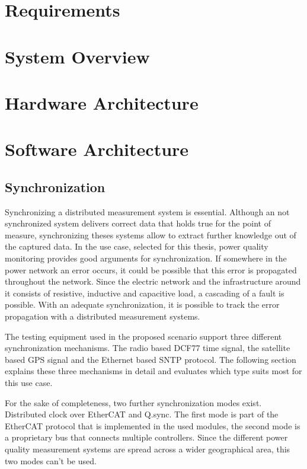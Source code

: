 \section{Requirements}

\section{System Overview}

\section{Hardware Architecture}

\section{Software Architecture}

\subsection{Synchronization}
Synchronizing a distributed measurement system is essential. Although an not synchronized system delivers correct data that holds true for the point of measure, synchronizing theses systems allow to extract further knowledge out of the captured data. In the use case, selected for this thesis, power quality monitoring provides good arguments for synchronization. If somewhere in the power network an error occurs, it could be possible that this error is propagated throughout the network. Since the electric network and the infrastructure around it consists of resistive, inductive and capacitive load, a cascading of a fault is possible. With an adequate synchronization, it is possible to track the error propagation with a distributed measurement systems.

The testing equipment used in the proposed scenario support three different synchronization mechanisms. The radio based DCF77 time signal, the satellite based GPS signal and the Ethernet based SNTP protocol. The following section explains these three mechanisms in detail and evaluates which type suits most for this use case.

For the sake of completeness, two further synchronization modes exist. Distributed clock over EtherCAT and Q.sync. The first mode is part of the EtherCAT protocol that is implemented in the used modules, the second mode is a proprietary bus that connects multiple controllers. Since the different power quality measurement systems are spread across a wider geographical area, this two modes can't be used.


